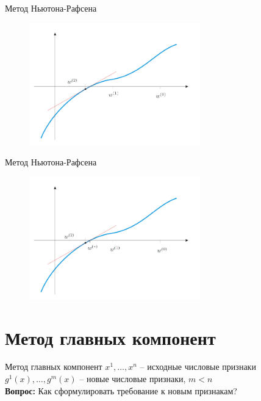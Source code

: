 \documentclass[10pt]{beamer}
\begin{document}
\begin{frame}{Метод Ньютона-Рафсена}
	\begin{figure}[htbp]
	  \includegraphics[height=150pt, keepaspectratio = true]{images/newton-15}   
	\end{figure}
\end{frame}

\begin{frame}{Метод Ньютона-Рафсена}
	\begin{figure}[htbp]
	  \includegraphics[height=150pt, keepaspectratio = true]{images/newton-16}   
	\end{figure}
\end{frame}

\section{Метод главных компонент}

{
\begin{frame}{Метод главных компонент}
	$x^1, \dots, x^n$ -- исходные числовые признаки\\
	$g^1(x), \dots, g^m(x)$ -- новые числовые признаки, $m < n$\\
	\bigbreak
	\textbf{Вопрос:} Как сформулировать требование к новым признакам?
\end{frame}
}
\end{document}
